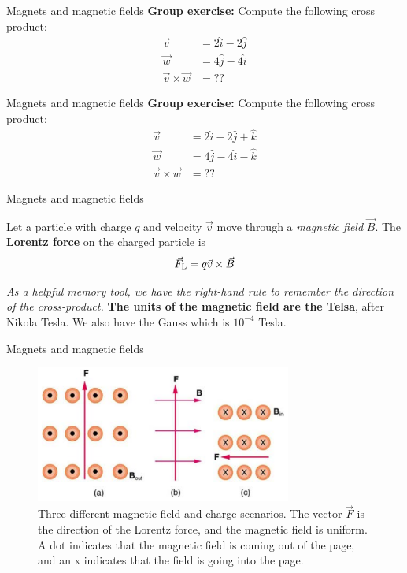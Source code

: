 \documentclass{beamer}
\begin{document}
\begin{frame}{Magnets and magnetic fields}
\textbf{Group exercise:} Compute the following cross product:
\begin{align}
\vec{v} &= 2\hat{i}-2\hat{j} \\
\vec{w} &= 4\hat{j}-4\hat{i} \\
\vec{v} \times \vec{w} &= ??
\end{align}
\end{frame}

\begin{frame}{Magnets and magnetic fields}
\textbf{Group exercise:} Compute the following cross product:
\begin{align}
\vec{v} &= 2\hat{i}-2\hat{j}+\hat{k} \\
\vec{w} &= 4\hat{j}-4\hat{i}-\hat{k} \\
\vec{v} \times \vec{w} &= ??
\end{align}
\end{frame}

\begin{frame}{Magnets and magnetic fields}
\begin{tcolorbox}[colback=white,colframe=black!100!black,title=The Lorentz Force]
\alert{Let a particle with charge $q$ and velocity $\vec{v}$ move through a \textit{magnetic field} $\vec{B}$.  The \textbf{Lorentz force} on the charged particle is
\begin{equation}
\vec{F}_{\rm L} = q\vec{v} \times \vec{B}
\label{eq:Lorentz}
\end{equation}}
\end{tcolorbox}
\textit{As a helpful memory tool, we have the right-hand rule to remember the direction of the cross-product.}  \textbf{The units of the magnetic field are the Telsa}, after Nikola Tesla.  We also have the Gauss which is $10^{-4}$ Tesla.
\end{frame}

\begin{frame}{Magnets and magnetic fields}
\begin{figure}
\centering
\includegraphics[width=0.75\textwidth]{figures/lorentzProblem.png}
\caption{\label{fig:lorentzProblem} Three different magnetic field and charge scenarios.  The vector $\vec{F}$ is the direction of the Lorentz force, and the magnetic field is uniform.  A dot indicates that the magnetic field is coming out of the page, and an x indicates that the field is going into the page.}
\end{figure}
\end{frame}
\end{document}
